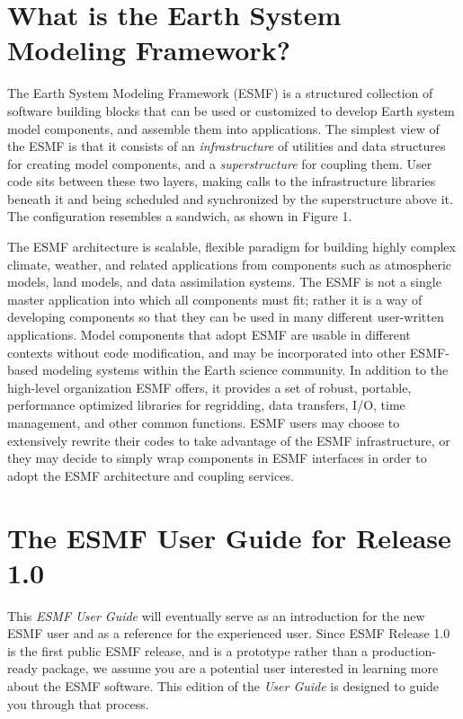 \section{What is the Earth System Modeling Framework?}

The Earth System Modeling Framework (ESMF) is a structured collection of 
software building blocks that can be used or customized to develop 
Earth system model components, and assemble them into applications.  
The simplest view of the ESMF is that it consists of an
{\it infrastructure} of utilities and data structures for creating 
model components, and a {\it superstructure} for coupling them.  
User code sits between these two layers, making calls to the infrastructure
libraries beneath it and being scheduled and synchronized by the 
superstructure above it.  The configuration resembles a sandwich, as
shown in Figure 1.

The ESMF architecture is scalable, flexible paradigm for building highly 
complex climate, weather, and related applications from components such
as atmospheric models, land models, and data assimilation systems.  The 
ESMF is not a single master application into which all components must fit; 
rather it is a way of developing components so that they can be used 
in many different user-written applications.  Model components that adopt 
ESMF are usable in different contexts without code modification, and may be
incorporated into other ESMF-based modeling systems within the Earth 
science community.  In addition to the high-level organization ESMF
offers, it provides a set of robust, portable, performance 
optimized libraries for regridding, data transfers, I/O, time management, 
and other common functions.  ESMF users may choose to extensively rewrite 
their codes to take advantage of the ESMF infrastructure, or they may 
decide to simply wrap components in ESMF interfaces in order to
adopt the ESMF architecture and coupling services.

\section{The ESMF User Guide for Release 1.0}

This {\it ESMF User Guide} will eventually serve as an introduction for the 
new ESMF user and as a reference for the experienced user.  Since ESMF 
Release 1.0 is the first public ESMF release, and is a prototype rather than 
a production-ready package, we assume you are a potential user interested in 
learning more about the ESMF software.  This edition of the {\it User Guide} 
is designed to guide you through that process.  

